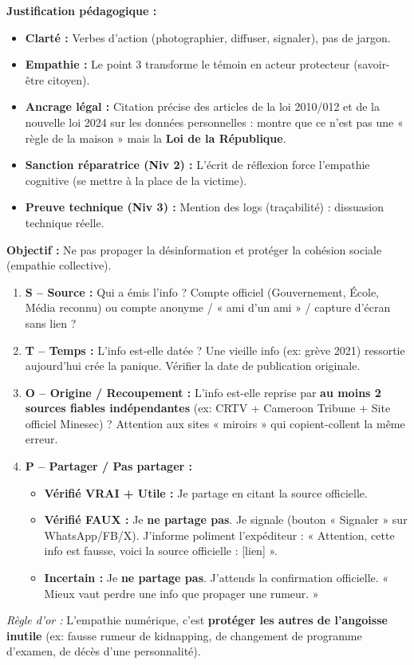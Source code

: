 \documentclass[11pt]{article}
\begin{document}
\begin{exoresolu}
\textbf{Justification pédagogique :}
\begin{itemize}
    \item \textbf{Clarté :} Verbes d'action (photographier, diffuser, signaler), pas de jargon.
    \item \textbf{Empathie :} Le point 3 transforme le témoin en acteur protecteur (savoir-être citoyen).
    \item \textbf{Ancrage légal :} Citation précise des articles de la loi 2010/012 et de la nouvelle loi 2024 sur les données personnelles : montre que ce n'est pas une « règle de la maison » mais la \textbf{Loi de la République}.
    \item \textbf{Sanction réparatrice (Niv 2) :} L'écrit de réflexion force l'empathie cognitive (se mettre à la place de la victime).
    \item \textbf{Preuve technique (Niv 3) :} Mention des logs (traçabilité) : dissuasion technique réelle.
\end{itemize}
\end{exoresolu}

\begin{methode}
\textbf{Objectif :} Ne pas propager la désinformation et protéger la cohésion sociale (empathie collective).
\begin{enumerate}
    \item \textbf{S -- Source :} Qui a émis l'info ? Compte officiel (Gouvernement, École, Média reconnu) ou compte anonyme / « ami d'un ami » / capture d'écran sans lien ?
    \item \textbf{T -- Temps :} L'info est-elle datée ? Une vieille info (ex: grève 2021) ressortie aujourd'hui crée la panique. Vérifier la date de publication originale.
    \item \textbf{O -- Origine / Recoupement :} L'info est-elle reprise par \textbf{au moins 2 sources fiables indépendantes} (ex: CRTV + Cameroon Tribune + Site officiel Minesec) ? Attention aux sites « miroirs » qui copient-collent la même erreur.
    \item \textbf{P -- Partager / Pas partager :}
    \begin{itemize}
        \item \textbf{Vérifié VRAI + Utile :} Je partage en citant la source officielle.
        \item \textbf{Vérifié FAUX :} Je \textbf{ne partage pas}. Je signale (bouton « Signaler » sur WhatsApp/FB/X). J'informe poliment l'expéditeur : « Attention, cette info est fausse, voici la source officielle : [lien] ».
        \item \textbf{Incertain :} Je \textbf{ne partage pas}. J'attends la confirmation officielle. « Mieux vaut perdre une info que propager une rumeur. »
    \end{itemize}
\end{enumerate}
\emph{Règle d'or :} L'empathie numérique, c'est \textbf{protéger les autres de l'angoisse inutile} (ex: fausse rumeur de kidnapping, de changement de programme d'examen, de décès d'une personnalité).
\end{methode}
\end{document}
